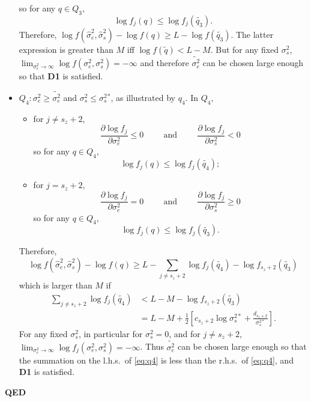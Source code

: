 \documentclass{report}
\newcommand{\RL}{f}
\newcommand{\logRL}{\log\RL}
\newcommand{\sigssq}{\sigma_s^2}
\newcommand{\sigesq}{\sigma_e^2}
\newcommand{\sshat}{\hat\sigma^2_e,\hat\sigma^2_s}
\newcommand{\logRLss}{\logRL(\sigesq,\sigssq)}
\begin{document}
\begin{itemize}
  so for any $q \in Q_3$,
  \begin{equation*}
    \logRL_j(q) \le \logRL_j(\widetilde{q_3}).
  \end{equation*}
  Therefore, $\logRL(\sshat) - \logRL(q) \ge L - \logRL(\widetilde{q_3})$.  The latter expression is greater than
  $M$ iff $\logRL(\widetilde{q}) < L-M$.  But for any fixed $\sigssq$,
  $\lim_{\sigesq \rightarrow \infty} \logRLss = -\infty$ and therefore $\widetilde{\sigma_e^2}$
  can be chosen large enough so that \textbf{D1} is satisfied.
\item $Q_4: \sigesq \ge \widetilde{\sigesq}$ and $\sigssq \le \sigssq{}^*$, as illustrated by $q_4$.  In $Q_4$,
  \begin{itemize}
  \item for $j \ne s_z+2$,
    \begin{equation*}
      \frac{\partial\logRL_j}{\partial\sigesq} \le 0 \hspace{1cm} \text{and} \hspace{1cm}
      \frac{\partial\logRL_j}{\partial\sigssq} < 0
    \end{equation*}
    so for any $q \in Q_4$,
    \begin{equation*}
      \logRL_j(q) \le \logRL_j(\widetilde{q_4});
    \end{equation*}
  \item  for $j = s_z+2$,
    \begin{equation*}
      \frac{\partial\logRL_j}{\partial\sigesq} = 0 \hspace{1cm} \text{and} \hspace{1cm}
      \frac{\partial\logRL_j}{\partial\sigssq} \ge 0
    \end{equation*}
    so for any $q \in Q_4$,
    \begin{equation*}
      \logRL_j(q) \le \logRL_j(\widetilde{q_3}).
    \end{equation*}
  \end{itemize}
  Therefore,
  \begin{equation*}
	\logRL(\sshat) - \logRL(q) \ge L - \sum_{j \ne s_z+2} \logRL_j(\widetilde{q_4}) - \logRL_{s_z+2}(\widetilde{q_3})
  \end{equation*}
  which is larger than $M$ if
  \begin{equation}
  \label{eq:q4}
    \begin{split}
      \sum_{j \ne s_z+2} \logRL_j(\widetilde{q_4})
        &< L - M - \logRL_{s_z+2}(\widetilde{q_3})\\
        &= L - M + \frac{1}{2} \left[ c_{s_z+2}\log\sigma_s^{2*} + \frac{d_{s_z+2}}{\sigma_s^{2*}}\right].
    \end{split}
  \end{equation}
  For any fixed $\sigssq$, in particular for $\sigssq=0$, and for $j \ne s_z+2$,\\ $\lim_{\sigesq \rightarrow \infty}
  \logRL_j(\sigesq,\sigssq) = -\infty$.  Thus $\widetilde{\sigma_e^2}$ can be chosen large enough so that the
  summation on the l.h.s.~of \eqref{eq:q4} is less than the r.h.s.~of \eqref{eq:q4}, and  \textbf{D1} is satisfied.\end{itemize}  
\textbf{QED}\\
\end{document}
